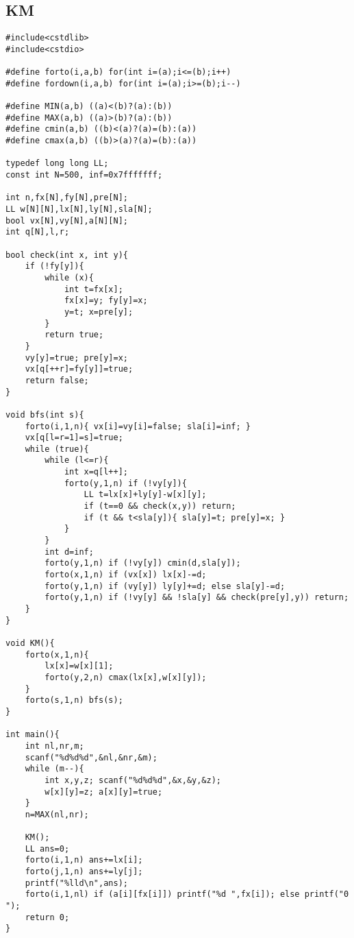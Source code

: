 \documentclass{article}
\begin{document}
\subsection{KM}
\begin{lstlisting}
#include<cstdlib>
#include<cstdio>

#define forto(i,a,b) for(int i=(a);i<=(b);i++)
#define fordown(i,a,b) for(int i=(a);i>=(b);i--)

#define MIN(a,b) ((a)<(b)?(a):(b))
#define MAX(a,b) ((a)>(b)?(a):(b))
#define cmin(a,b) ((b)<(a)?(a)=(b):(a))
#define cmax(a,b) ((b)>(a)?(a)=(b):(a))

typedef long long LL;
const int N=500, inf=0x7fffffff;

int n,fx[N],fy[N],pre[N];
LL w[N][N],lx[N],ly[N],sla[N];
bool vx[N],vy[N],a[N][N];
int q[N],l,r;

bool check(int x, int y){
	if (!fy[y]){
		while (x){
			int t=fx[x];
			fx[x]=y; fy[y]=x;
			y=t; x=pre[y];
		}
		return true;
	}
	vy[y]=true; pre[y]=x;
	vx[q[++r]=fy[y]]=true;
	return false;
}

void bfs(int s){
	forto(i,1,n){ vx[i]=vy[i]=false; sla[i]=inf; }
	vx[q[l=r=1]=s]=true;
	while (true){
		while (l<=r){
			int x=q[l++];
			forto(y,1,n) if (!vy[y]){
				LL t=lx[x]+ly[y]-w[x][y];
				if (t==0 && check(x,y)) return;
				if (t && t<sla[y]){ sla[y]=t; pre[y]=x; }
			}
		}
		int d=inf;
		forto(y,1,n) if (!vy[y]) cmin(d,sla[y]);
		forto(x,1,n) if (vx[x]) lx[x]-=d;
		forto(y,1,n) if (vy[y]) ly[y]+=d; else sla[y]-=d;
		forto(y,1,n) if (!vy[y] && !sla[y] && check(pre[y],y)) return;
	}
}

void KM(){
	forto(x,1,n){
		lx[x]=w[x][1];
		forto(y,2,n) cmax(lx[x],w[x][y]);
	}
	forto(s,1,n) bfs(s);
}

int main(){
	int nl,nr,m;
	scanf("%d%d%d",&nl,&nr,&m);
	while (m--){
		int x,y,z; scanf("%d%d%d",&x,&y,&z);
		w[x][y]=z; a[x][y]=true;
	}
	n=MAX(nl,nr);
	
	KM();
	LL ans=0;
	forto(i,1,n) ans+=lx[i];
	forto(j,1,n) ans+=ly[j];
	printf("%lld\n",ans);
	forto(i,1,nl) if (a[i][fx[i]]) printf("%d ",fx[i]); else printf("0 ");
	return 0;
}
\end{lstlisting}
\end{document}
